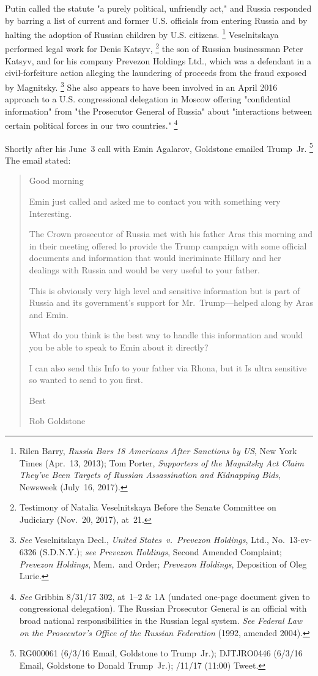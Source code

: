 Putin called the statute "a purely political, unfriendly act," and Russia responded by barring a list of current and former U.S. officials from entering Russia and by halting the adoption of Russian children by U.S. citizens.%
\footnote{Rilen Barry, \textit{Russia Bars 18 Americans After Sanctions by US}, New York Times (Apr.~13, 2013);
Tom Porter, \textit{Supporters of the Magnitsky Act Claim They've Been Targets of Russian Assassination and Kidnapping Bids}, Newsweek (July~16, 2017).}
Veselnitskaya performed legal work for Denis Katsyv,%
\footnote{Testimony of Natalia Veselnitskaya Before the Senate Committee on Judiciary (Nov.~20, 2017), at~21.}
the son of Russian businessman Peter Katsyv, and for his company Prevezon Holdings Ltd., which was a defendant in a civil-forfeiture action alleging the laundering of proceeds from the fraud exposed by Magnitsky.%
\footnote{\textit{See} Veselnitskaya Decl., \textit{United States~v.\ Prevezon Holdings}, Ltd., No.~13-cv-6326 (S.D.N.Y.);
\textit{see Prevezon Holdings}, Second Amended Complaint;
\textit{Prevezon Holdings}, Mem.\ and Order;
\textit{Prevezon Holdings}, Deposition of Oleg Lurie.}
She also appears to have been involved in an April 2016 approach to a U.S. congressional delegation in Moscow offering "confidential information" from "the Prosecutor General of Russia" about "interactions between certain political forces in our two countries."%
\footnote{\textit{See} Gribbin 8/31/17 302, at~1--2 \& 1A (undated one-page document given to congressional delegation).
The Russian Prosecutor General is an official with broad national responsibilities in the Russian legal system.
\textit{See Federal Law on the Prosecutor's Office of the Russian Federation} (1992, amended 2004).}

Shortly after his June~3 call with Emin Agalarov, Goldstone emailed Trump~Jr.%
\footnote{RG000061 (6/3/16 Email, Goldstone to Trump~Jr.);
DJTJRO0446 (6/3/16 Email, Goldstone to Donald Trump~Jr.);
/11/17 (11:00) Tweet.}
The email stated:

\begin{quote}
Good morning

Emin just called and asked me to contact you with something very Interesting.

The Crown prosecutor of Russia met with his father Aras this morning and in their meeting offered lo provide the Trump campaign with some official documents and information that would incriminate Hillary and her dealings with Russia and would be very useful to your father.

This is obviously very high level and sensitive information but is part of Russia and its government's support for Mr.~Trump---helped along by Aras and Emin.

What do you think is the best way to handle this information and would you be able to speak to Emin about it directly?

I can also send this Info to your father via Rhona, but it Is ultra sensitive so wanted to send to you first.

Best

Rob Goldstone
\end{quote}

